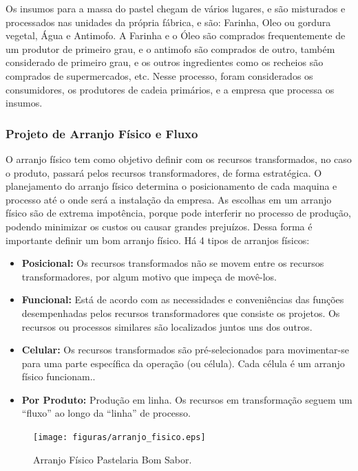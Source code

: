 Os insumos para a massa do pastel chegam de vários lugares, e são misturados e processados nas unidades da própria fábrica, e são: Farinha, Oleo ou gordura vegetal, Água e Antimofo. A Farinha e o Óleo são comprados frequentemente de um produtor de primeiro grau, e o antimofo são comprados de outro, também considerado de primeiro grau, e os outros ingredientes como os recheios são comprados de supermercados, etc. Nesse processo, foram considerados os consumidores, os produtores de cadeia primários, e a empresa que processa os insumos.


\subsubsection{Projeto de Arranjo Físico e Fluxo}

O arranjo físico tem como objetivo definir com os recursos transformados, no caso o produto, passará pelos recursos transformadores, de forma estratégica. O planejamento do arranjo físico determina o posicionamento de cada maquina e processo até o onde será a instalação da empresa. As escolhas em um arranjo físico são de extrema impotência, porque pode interferir no processo de produção, podendo minimizar os custos ou causar grandes prejuízos. Dessa forma é importante definir um bom arranjo físico.
Há 4 tipos de arranjos físicos:

\begin{itemize}
  \item \textbf{Posicional:} Os recursos transformados não se movem entre os recursos transformadores, por algum motivo que impeça de movê-los.
  \item \textbf{Funcional:} Está de acordo com as necessidades e conveniências das funções desempenhadas pelos recursos transformadores que consiste os projetos. Os recursos ou processos similares são localizados juntos uns dos outros.
  \item \textbf{Celular:} Os recursos transformados são pré-selecionados para movimentar-se para uma parte específica da operação (ou célula). Cada célula é um arranjo físico funcionam..
  \item \textbf{Por Produto:} Produção em linha. Os recursos em transformação seguem um “fluxo” ao longo da “linha” de processo.
\end{itemize}

\begin{figure}[H]
    \centering
  \texttt{[image: figuras/arranjo\_fisico.eps]}
    \caption{Arranjo Físico Pastelaria Bom Sabor.}
    \label{fig:arranjo_fisico}
\end{figure}

